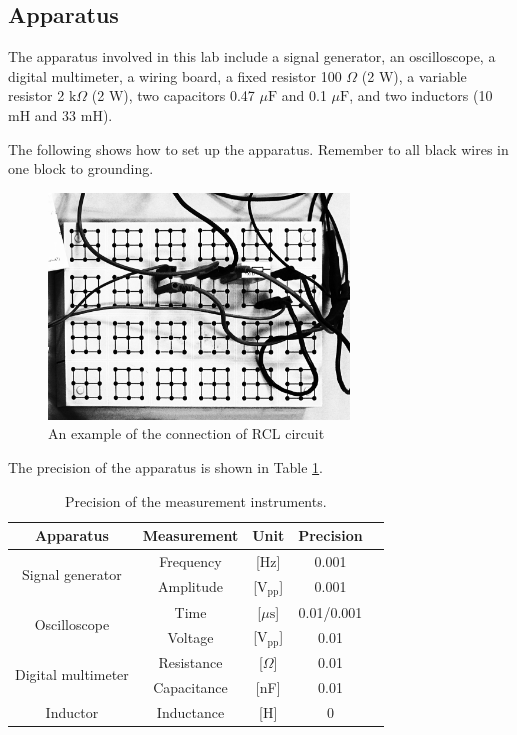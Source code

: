 \documentclass[a4paper]{article}
\begin{document}
\subsection{Apparatus}

The apparatus involved in this lab include a signal generator, an oscilloscope, a digital multimeter, a wiring board, a fixed resistor 100 $\Omega$ (2 W), a variable resistor 2 $\text{k}\Omega$ (2 W), two capacitors 0.47 $\mu \text{F}$ and 0.1 $\mu\text{F}$, and two inductors (10 mH and 33 mH).

The following shows how to set up the apparatus. Remember to all black wires in one block to grounding.

\begin{figure}[!htbp]
	\centering
	\includegraphics[width=8cm]{breadboard.jpg}
	\caption{An example of the connection of RCL circuit}
	\label{fig::breadboard}
\end{figure}

The precision of the apparatus is shown in Table \ref{table::precision}.

\begin{table}[!htbp]
	\centering
	\begin{tabular}{c c c c c}
		\hline \hline
		Apparatus                           & Measurement & Unit                     & Precision  \\
		\hline
		\multirow{2}{*}{Signal generator}   & Frequency   & [Hz]                     & 0.001      \\
		                                    & Amplitude   & [$\text{V}_{\text{pp}}$] & 0.001      \\

		\multirow{2}{*}{Oscilloscope}       & Time        & [$\mu\text{s}$]          & 0.01/0.001 \\
		                                    & Voltage     & [$\text{V}_{\text{pp}}$] & 0.01       \\

		\multirow{2}{*}{Digital multimeter} & Resistance  & [$\Omega$]               & 0.01       \\
		                                    & Capacitance & [nF]                     & 0.01       \\

		Inductor                            & Inductance  & [H]                      & 0          \\
		\hline \hline
	\end{tabular}
	\caption{Precision of the measurement instruments.}
	\label{table::precision}
\end{table}
\end{document}
